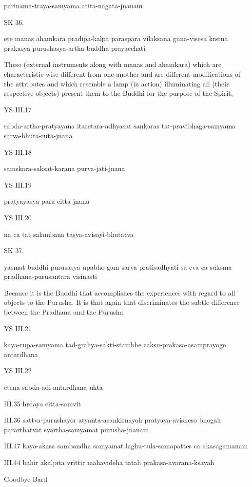 parinama-traya-samyama atita-nagata-jnanam

SK 36.

ete manas ahamkara pradipa-kalpa paraspara vilaksana
guna-visesa krstna prakasya purushasya-artha buddha prayacchati

These (external instruments along with manas and ahamkara)
which are characteristic-wise different from one another
and are different modifications of the attributes
and which resemble a lamp (in action)
illuminating all (their respective objects)
present them to the Buddhi for the purpose of the Spirit,

YS III.17

sabda-artha-pratyayana itaretara-adhyasat sankaras
tat-pravibhaga-samyama sarva-bhuta-ruta-jnana

YS III.18

samskara-saksat-karana purva-jati-jnana

YS III.19

pratyayasya para-citta-jnana

YS III.20

na ca tat salambana tasya-avisayi-bhutatva

SK 37.

yasmat buddhi purusasya upabho-gam sarva pratisadhyati
sa eva ca suksma pradhana-purusantara visinasti

Because it is the Buddhi that accomplishes the experiences
with regard to all objects to the Purusha.
It is that again that discriminates the subtle difference
between the Pradhana and the Purusha.

YS III.21

kaya-rupa-samyama tad-grahya-sakti-stambhe
caksu-prakasa-asamprayoge antardhana

YS III.22

etena sabda-adi-antardhana ukta


III.35
hrdaya citta-samvit

III.36
sattva-purushayor atyanta-asankirnayoh pratyaya-avisheso bhogah pararthatvat svartha-samyamat purusha-jnanam


III.47
kaya-akasa sambandha samyamat laghu-tula-samapattes ca akasagamanam


III.44
bahir akalpita vrittir mahavideha tatah prakasa-avarana-ksayah

Goodbye Bard
